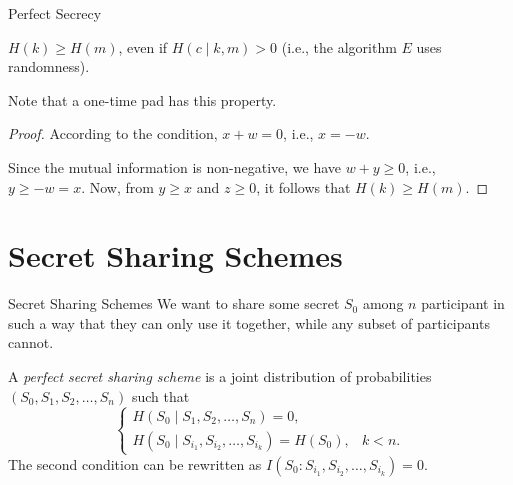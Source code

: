 \documentclass[
handout,
aspectratio=169]{beamer}
\newcommand{\seqn}[2]{{#1}_1,{#1}_2,\dotsc,{#1}_{#2}}
\newcommand{\seqin}[3]{{#1}_{{#2}_1},{#1}_{{#2}_2},\dotsc,{#1}_{{#2}_{#3}}}
\begin{document}
\begin{frame}{Perfect Secrecy}
    \begin{theorem}[Shannon]
        $H(k) \ge H(m)$, even if $H(c \mid k, m) > 0$ (i.e., the algorithm $E$ uses randomness).
    \end{theorem}
    Note that a one-time pad has this property.
    \pause
    \begin{proof}
        According to the condition, $x + w = 0$, i.e., $x = -w$.

        \begin{center}
        \end{center}
        Since the mutual information is non-negative, we have $w + y \ge 0$, i.e.,
        $y \ge -w = x$. Now, from $y \ge x$ and $z \ge 0$, it follows that $H(k) \ge H(m)$.
    \end{proof}
\end{frame}

\section{Secret Sharing Schemes}
\begin{frame}{Secret Sharing Schemes}
    We want to share some secret $S_0$ among $n$ participant in such a way that they can only use it together, while any subset of participants cannot.

    \begin{definition}
        A \emph{perfect secret sharing scheme} is a joint distribution of probabilities $(S_0, \seqn{S}{n})$ such that
        \[
        \begin{cases}
            H(S_0 \mid \seqn{S}{n}) = 0,\\
            H(S_0 \mid \seqin{S}{i}{k}) = H(S_0), & k < n.
        \end{cases}
        \]
        The second condition can be rewritten as $I(S_0 : \seqin{S}{i}{k}) = 0$.
    \end{definition}
\end{frame}
\end{document}
